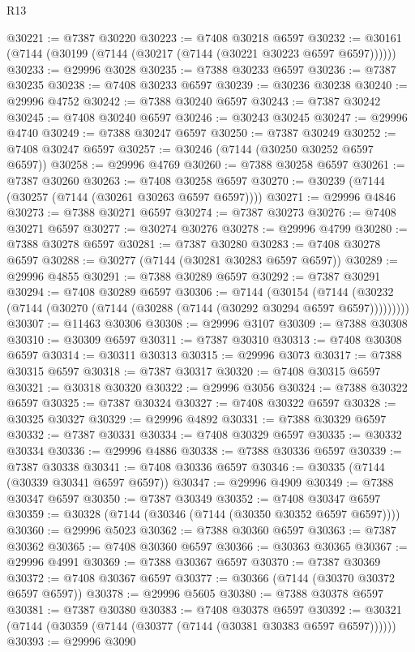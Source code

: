 \begin{lexlean}{R13}
\begin{coremodule}
@30221 := @7387 @30220
@30223 := @7408 @30218 @6597
@30232 := @30161 (@7144 (@30199 (@7144 (@30217 (@7144 (@30221 @30223 @6597 @6597))))))
@30233 := @29996 @3028
@30235 := @7388 @30233 @6597
@30236 := @7387 @30235
@30238 := @7408 @30233 @6597
@30239 := @30236 @30238
@30240 := @29996 @4752
@30242 := @7388 @30240 @6597
@30243 := @7387 @30242
@30245 := @7408 @30240 @6597
@30246 := @30243 @30245
@30247 := @29996 @4740
@30249 := @7388 @30247 @6597
@30250 := @7387 @30249
@30252 := @7408 @30247 @6597
@30257 := @30246 (@7144 (@30250 @30252 @6597 @6597))
@30258 := @29996 @4769
@30260 := @7388 @30258 @6597
@30261 := @7387 @30260
@30263 := @7408 @30258 @6597
@30270 := @30239 (@7144 (@30257 (@7144 (@30261 @30263 @6597 @6597))))
@30271 := @29996 @4846
@30273 := @7388 @30271 @6597
@30274 := @7387 @30273
@30276 := @7408 @30271 @6597
@30277 := @30274 @30276
@30278 := @29996 @4799
@30280 := @7388 @30278 @6597
@30281 := @7387 @30280
@30283 := @7408 @30278 @6597
@30288 := @30277 (@7144 (@30281 @30283 @6597 @6597))
@30289 := @29996 @4855
@30291 := @7388 @30289 @6597
@30292 := @7387 @30291
@30294 := @7408 @30289 @6597
@30306 := @7144
    (@30154 (@7144 (@30232 (@7144 (@30270 (@7144 (@30288 (@7144 (@30292 @30294 @6597 @6597)))))))))
@30307 := @11463 @30306
@30308 := @29996 @3107
@30309 := @7388 @30308
@30310 := @30309 @6597
@30311 := @7387 @30310
@30313 := @7408 @30308 @6597
@30314 := @30311 @30313
@30315 := @29996 @3073
@30317 := @7388 @30315 @6597
@30318 := @7387 @30317
@30320 := @7408 @30315 @6597
@30321 := @30318 @30320
@30322 := @29996 @3056
@30324 := @7388 @30322 @6597
@30325 := @7387 @30324
@30327 := @7408 @30322 @6597
@30328 := @30325 @30327
@30329 := @29996 @4892
@30331 := @7388 @30329 @6597
@30332 := @7387 @30331
@30334 := @7408 @30329 @6597
@30335 := @30332 @30334
@30336 := @29996 @4886
@30338 := @7388 @30336 @6597
@30339 := @7387 @30338
@30341 := @7408 @30336 @6597
@30346 := @30335 (@7144 (@30339 @30341 @6597 @6597))
@30347 := @29996 @4909
@30349 := @7388 @30347 @6597
@30350 := @7387 @30349
@30352 := @7408 @30347 @6597
@30359 := @30328 (@7144 (@30346 (@7144 (@30350 @30352 @6597 @6597))))
@30360 := @29996 @5023
@30362 := @7388 @30360 @6597
@30363 := @7387 @30362
@30365 := @7408 @30360 @6597
@30366 := @30363 @30365
@30367 := @29996 @4991
@30369 := @7388 @30367 @6597
@30370 := @7387 @30369
@30372 := @7408 @30367 @6597
@30377 := @30366 (@7144 (@30370 @30372 @6597 @6597))
@30378 := @29996 @5605
@30380 := @7388 @30378 @6597
@30381 := @7387 @30380
@30383 := @7408 @30378 @6597
@30392 := @30321 (@7144 (@30359 (@7144 (@30377 (@7144 (@30381 @30383 @6597 @6597))))))
@30393 := @29996 @3090

\end{coremodule}
\end{lexlean}
